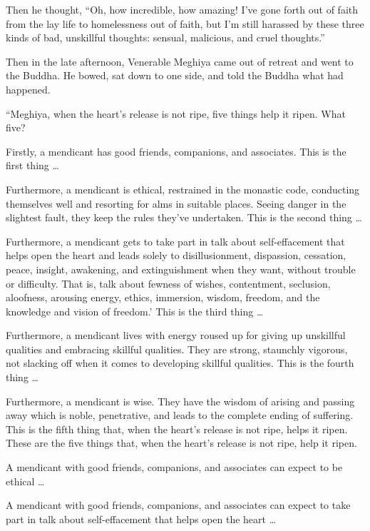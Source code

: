 \documentclass[12pt,openany]{book}%
\begin{document}
Then he thought, “Oh, how incredible, how amazing! I’ve gone forth out of faith from the lay life to homelessness out of faith, but I’m still harassed by these three kinds of bad, unskillful thoughts: sensual, malicious, and cruel thoughts.” 

Then in the late afternoon, Venerable Meghiya came out of retreat and went to the Buddha. He bowed, sat down to one side, and told the Buddha what had happened. 

“Meghiya, when the heart’s release is not ripe, five things help it ripen. What five? 

Firstly, a mendicant has good friends, companions, and associates. This is the first thing … 

Furthermore, a mendicant is ethical, restrained in the monastic code, conducting themselves well and resorting for alms in suitable places. Seeing danger in the slightest fault, they keep the rules they’ve undertaken. This is the second thing … 

Furthermore, a mendicant gets to take part in talk about self-effacement that helps open the heart and leads solely to disillusionment, dispassion, cessation, peace, insight, awakening, and extinguishment when they want, without trouble or difficulty. That is, talk about fewness of wishes, contentment, seclusion, aloofness, arousing energy, ethics, immersion, wisdom, freedom, and the knowledge and vision of freedom.’ This is the third thing … 

Furthermore, a mendicant lives with energy roused up for giving up unskillful qualities and embracing skillful qualities. They are strong, staunchly vigorous, not slacking off when it comes to developing skillful qualities. This is the fourth thing … 

Furthermore, a mendicant is wise. They have the wisdom of arising and passing away which is noble, penetrative, and leads to the complete ending of suffering. This is the fifth thing that, when the heart’s release is not ripe, helps it ripen. These are the five things that, when the heart’s release is not ripe, help it ripen. 

A mendicant with good friends, companions, and associates can expect to be ethical … 

A mendicant with good friends, companions, and associates can expect to take part in talk about self-effacement that helps open the heart … 
\end{document}
